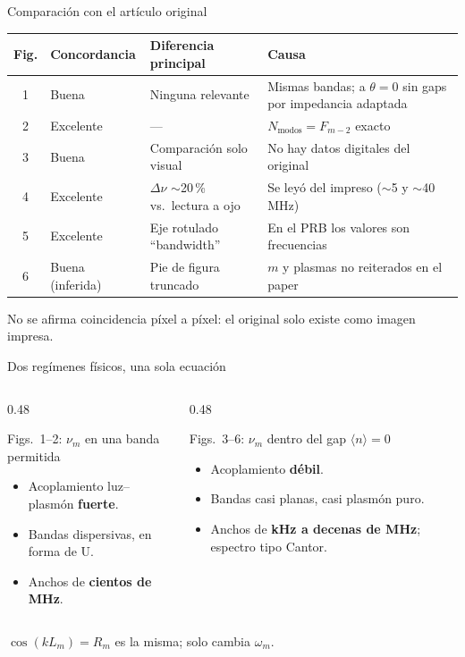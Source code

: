 \documentclass[aspectratio=169,10pt]{beamer}
\newcommand{\num}{\nu_m}
\begin{document}
\begin{frame}{Comparación con el artículo original}
  \centering
  \small
  \begin{tabular}{@{}clp{4.3cm}p{5.2cm}@{}}
    \toprule
    Fig. & Concordancia & Diferencia principal & Causa \\
    \midrule
    1 & Buena & Ninguna relevante & Mismas bandas; a $\theta=0$ sin gaps por impedancia adaptada \\
    2 & Excelente & --- & $N_{\text{modos}} = F_{m-2}$ exacto \\
    3 & Buena & Comparación solo visual & No hay datos digitales del original \\
    4 & Excelente & $\Delta\nu$ $\sim$20\,\% vs.\ lectura a ojo & Se leyó del impreso ($\sim$5 y $\sim$40 MHz) \\
    5 & Excelente & Eje rotulado ``bandwidth'' & En el PRB los valores son frecuencias \\
    6 & Buena (inferida) & Pie de figura truncado & $m$ y plasmas no reiterados en el paper \\
    \bottomrule
  \end{tabular}
  \vspace{0.8em}

  No se afirma coincidencia píxel a píxel: el original solo existe como imagen impresa.
\end{frame}

\begin{frame}{Dos regímenes físicos, una sola ecuación}
  \begin{columns}[T]
    \begin{column}{0.48\textwidth}
      \begin{block}{Figs.~1--2: $\num$ en una banda permitida}
        \begin{itemize}
          \item Acoplamiento luz--plasmón \textbf{fuerte}.
          \item Bandas dispersivas, en forma de U.
          \item Anchos de \textbf{cientos de MHz}.
        \end{itemize}
      \end{block}
    \end{column}
    \begin{column}{0.48\textwidth}
      \begin{alertblock}{Figs.~3--6: $\num$ dentro del gap $\langle n\rangle=0$}
        \begin{itemize}
          \item Acoplamiento \textbf{débil}.
          \item Bandas casi planas, casi plasmón puro.
          \item Anchos de \textbf{kHz a decenas de MHz}; espectro tipo Cantor.
        \end{itemize}
      \end{alertblock}
    \end{column}
  \end{columns}
  \vspace{1em}
  \centering
  \Large $\cos(kL_m) = R_m$ \normalsize\quad es la misma; solo cambia $\omega_m$.
\end{frame}
\end{document}
